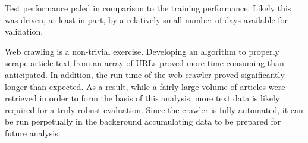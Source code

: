 \documentclass{article}
\begin{document}
Test performance paled in comparison to the training performance.  Likely this was driven, at least in part, by a relatively small number of days available for validation.  

Web crawling is a non-trivial exercise.  Developing an algorithm to properly scrape article text from an array of URLs proved more time consuming than anticipated.  In addition, the run time of the web crawler proved significantly longer than expected.  As a result, while a fairly large volume of articles were retrieved in order to form the basis of this analysis, more text data is likely required for a truly robust evaluation.  Since the crawler is fully automated, it can be run perpetually in the background accumulating data to be prepared for future analysis.


 


\printbibliography
\end{document}
